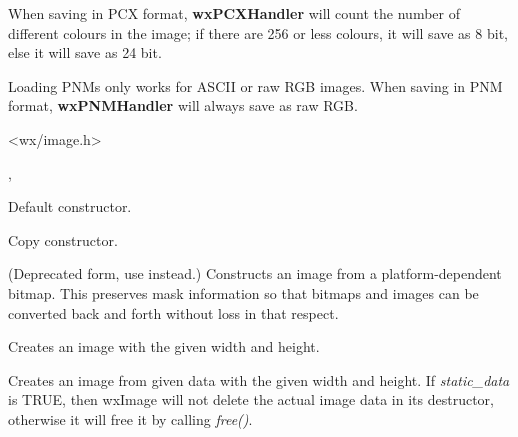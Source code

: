 When saving in PCX format, {\bf wxPCXHandler} will count the number of
different colours in the image; if there are 256 or less colours, it will
save as 8 bit, else it will save as 24 bit.

Loading PNMs only works for ASCII or raw RGB images. When saving in
PNM format, {\bf wxPNMHandler} will always save as raw RGB.




<wx/image.h>


, 


\label{wximageconstr}


Default constructor.


Copy constructor.


(Deprecated form, use 
instead.) Constructs an image from a platform-dependent bitmap. This preserves
mask information so that bitmaps and images can be converted back
and forth without loss in that respect.


Creates an image with the given width and height.


Creates an image from given data with the given width and height. If 
{\it static\_data} is TRUE, then wxImage will not delete the actual
image data in its destructor, otherwise it will free it by calling
{\it free()}.



